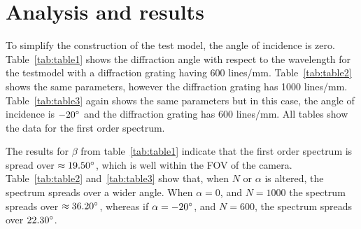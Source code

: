\documentclass[aps,twocolumn,twoside,secnumarabic,balancelastpage,amsmath,amssymb,nofootinbib,hyperref=pdftex]{revtex4}
\begin{document}
\section{Analysis and results}
To simplify the construction of the test model, the angle of incidence is zero. Table~\ref{tab:table1} shows the diffraction angle with respect to the wavelength for the testmodel with a diffraction grating having 600 lines/mm. Table~\ref{tab:table2} shows the same parameters, however the diffraction grating has 1000 lines/mm. Table~\ref{tab:table3} again shows the same parameters but in this case, the angle of incidence is $-20\degree$ and the diffraction grating has 600 lines/mm. All tables show the data for the first order spectrum. 

The results for $\beta$ from table~\ref{tab:table1} indicate that the first order spectrum is spread over $\approx19.50\degree$, which is well within the FOV of the camera. Table~\ref{tab:table2} and~\ref{tab:table3} show that, when $N$ or $\alpha$ is altered, the spectrum spreads over a wider angle. When $\alpha=0$, and $N=1000$ the spectrum spreads over $\approx36.20\degree$, whereas if $\alpha=-20\degree$, and $N=600$, the spectrum spreads over $22.30\degree$.
\end{document}
